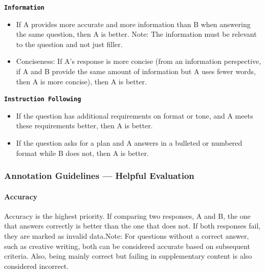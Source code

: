 \documentclass[11pt]{article}
\theoremstyle{plain}
\theoremstyle{definition}
\theoremstyle{remark}
\begin{document}
\textbf{\texttt{Information}}
\begin{itemize}[left=0cm]
    \item If A provides more accurate and more information than B when answering the same question, then A is better. Note: The information must be relevant to the question and not just filler.
    \item Conciseness: If A's response is more concise (from an information perspective, if A and B provide the same amount of information but A uses fewer words, then A is more concise), then A is better.
\end{itemize}
 
\textbf{\texttt{Instruction Following}}
\begin{itemize}[left=0cm]
    \item If the question has additional requirements on format or tone, and A meets these requirements better, then A is better.
    \item If the question asks for a plan and A answers in a bulleted or numbered format while B does not, then A is better.
\end{itemize}

\subsubsection{Annotation Guidelines — Helpful Evaluation}
\paragraph{Accuracy} Accuracy is the highest priority. If comparing two responses, A and B, the one that answers correctly is better than the one that does not. If both responses fail, they are marked as invalid data.Note: For questions without a correct answer, such as creative writing, both can be considered accurate based on subsequent criteria. Also, being mainly correct but failing in supplementary content is also considered incorrect.
\end{document}
